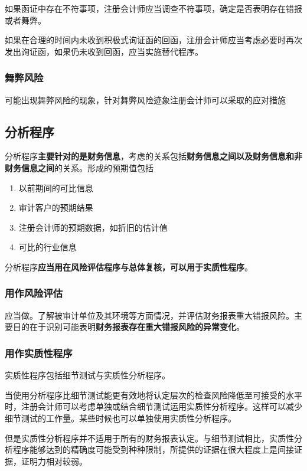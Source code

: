\documentclass[UTF8,12pt]{ctexart}
\numberwithin{equation}{section} %
\numberwithin{figure}{section}
\numberwithin{table}{section}
\begin{document}
	如果函证中存在不符事项，注册会计师应当调查不符事项，确定是否表明存在错报或者舞弊。
	
	如果在合理的时间内未收到积极式询证函的回函，注册会计师应当考虑必要时再次发出询证函，如果仍未收到回函，应当实施替代程序。
	
	\subsubsection{舞弊风险}
	
	可能出现舞弊风险的现象，针对舞弊风险迹象注册会计师可以采取的应对措施
	
	\subsection{分析程序}
	分析程序\textbf{主要针对的是财务信息}，考虑的关系包括\textbf{财务信息之间以及财务信息和非财务信息之间}的关系。形成的预期值包括
	\begin{enumerate}
		\item 以前期间的可比信息
		
		\item 审计客户的预期结果
		
		\item 注册会计师的预期数据，如折旧的估计值
		
		\item 可比的行业信息
	\end{enumerate}
	
	分析程序\textbf{应当用在风险评估程序与总体复核，可以用于实质性程序}。
	
	\subsubsection{用作风险评估}
	应当做。了解被审计单位及其环境等方面情况，并评估财务报表重大错报风险。主要目的在于识别可能表明\textbf{财务报表存在重大错报风险的异常变化}。
	
	\subsubsection{用作实质性程序}
	实质性程序包括细节测试与实质性分析程序。
	
	当使用分析程序比细节测试能更有效地将认定层次的检查风险降低至可接受的水平时，注册会计师可以考虑单独或结合细节测试运用实质性分析程序。这样可以减少细节测试的工作量。某些时候也可以单独使用实质性分析程序。
	
	但是实质性分析程序并不适用于所有的财务报表认定。与细节测试相比，实质性分析程序能够达到的精确度可能受到种种限制，所提供的证据在很大程度上是间接证据，证明力相对较弱。
	
\end{document}
